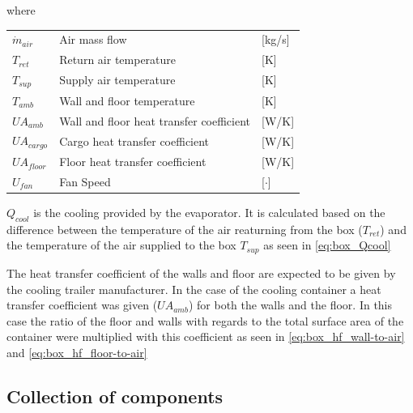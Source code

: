 where
\begin{center}
	\begin{tabular}{l p{8cm} l}
		$\dot{m}_{air}$			& Air mass flow 									& [\si{kg}/{\si{s}}] \\		
			$T_{ret}$			& Return air temperature 							& [\si{K}] \\		
			$T_{sup}$			& Supply air temperature							& [\si{K}] \\		
			$T_{amb}$			& Wall and floor temperature 						& [\si{K}] \\		
			$U A_{amb}$			& Wall and floor heat transfer coefficient 			& [\si{W}/\si{K}] \\		
			$U A_{cargo}$		& Cargo heat transfer coefficient 					& [\si{W}/\si{K}] \\		
			$U A_{floor}$		& Floor heat transfer coefficient 					& [\si{W}/\si{K}] \\		
			$U_{fan}$			& Fan Speed 										& [$\cdot$]
	\end{tabular}
\end{center}
	
	$Q_{cool}$ is the cooling provided by the evaporator. It is calculated based on the difference between the temperature of the air reaturning from the box ($T_{ret}$) and the temperature of the air supplied to the box $T_{sup}$ as seen in \cref{eq:box_Qcool}
	
	The heat transfer coefficient of the walls and floor are expected to be given by the cooling trailer manufacturer. In the case of the cooling container a heat transfer coefficient was given ($U A_{amb}$) for both the walls and the floor. In this case the ratio of the floor and walls with regards to the total surface area of the container were multiplied with this coefficient as seen in \cref{eq:box_hf_wall-to-air} and \cref{eq:box_hf_floor-to-air}


\clearpage
\subsection{Collection of components}

